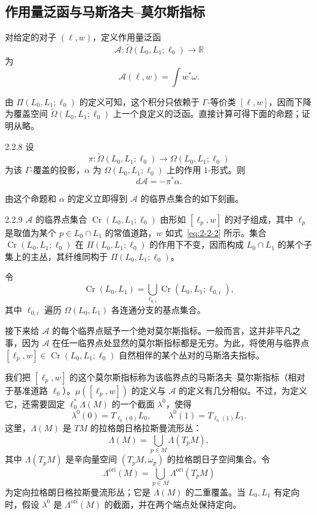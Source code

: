 \subsection{作用量泛函与马斯洛夫--莫尔斯指标}
\label{sec:2-2-2}

\begin{samepage}
对给定的对子 $(\ell,w)$，定义作用量泛函
\[
  \mathcal A:\widetilde\Omega(L_0,L_1;\ell_0)
  \longrightarrow\mathbb R
\]
为
\[
  \mathcal A(\ell,w)=\int w^*\omega.
\]
\end{samepage}
由 $\Pi(L_0,L_1;\ell_0)$ 的定义可知，这个积分只依赖于 $\Gamma$-等价类 $[\ell,w]$，因而下降为覆盖空间 $\widetilde\Omega(L_0,L_1;\ell_0)$ 上一个良定义的泛函。直接计算可得下面的命题；证明从略。

\begin{proposition}{2.2.8}\label{prop:2-2-8}
设
\[
  \pi:\widetilde\Omega(L_0,L_1;\ell_0)
  \longrightarrow\Omega(L_0,L_1;\ell_0)
\]
为该 $\Gamma$-覆盖的投影，$\alpha$ 为 $\Omega(L_0,L_1;\ell_0)$ 上的作用 $1$-形式。则
\[
  d\mathcal A=-\pi^*\alpha.
\]
\end{proposition}

由这个命题和 $\alpha$ 的定义立即得到 $\mathcal A$ 的临界点集合的如下刻画。

\begin{corollary}{2.2.9}\label{cor:2-2-9}
$\mathcal A$ 的临界点集合 $\operatorname{Cr}(L_0,L_1;\ell_0)$ 由形如 $[\ell_p,w]$ 的对子组成，其中 $\ell_p$ 是取值为某个 $p\in L_0\cap L_1$ 的常值道路，$w$ 如式~\eqref{eq:2-2-2} 所示。集合 $\operatorname{Cr}(L_0,L_1;\ell_0)$ 在 $\Pi(L_0,L_1;\ell_0)$ 的作用下不变，因而构成 $L_0\cap L_1$ 的某个子集上的主丛，其纤维同构于 $\Pi(L_0,L_1;\ell_0)$。
\end{corollary}

令
\[
  \operatorname{Cr}(L_0,L_1)
  =\bigcup_{\ell_{0,i}}
    \operatorname{Cr}(L_0,L_1;\ell_{0,i}),
\]
其中 $\ell_{0,i}$ 遍历 $\Omega(L_0,L_1)$ 各连通分支的基点集合。

接下来给 $\mathcal A$ 的每个临界点赋予一个绝对莫尔斯指标。一般而言，这并非平凡之事，因为 $\mathcal A$ 在任一临界点处显然的莫尔斯指标都是无穷。为此，将使用与临界点
$[\ell_p,w]\in\operatorname{Cr}(L_0,L_1;\ell_0)$ 自然相伴的某个丛对的马斯洛夫指标。

我们把 $[\ell_p,w]$ 的这个莫尔斯指标称为该临界点的马斯洛夫--莫尔斯指标（相对于基准道路 $\ell_0$）。$\mu([\ell_p,w])$ 的定义与 $\mathcal A$ 的定义有几分相似。不过，为定义它，还需要固定 $\ell_0^*\Lambda(M)$ 的一个截面 $\lambda^0$，使得
\[
  \lambda^0(0)=T_{\ell_0(0)}L_0,
  \qquad
  \lambda^0(1)=T_{\ell_0(1)}L_1.
\]
这里，$\Lambda(M)$ 是 $TM$ 的拉格朗日格拉斯曼流形丛：
\[
  \Lambda(M)=\bigcup_{p\in M}\Lambda(T_pM),
\]
其中 $\Lambda(T_pM)$ 是辛向量空间 $(T_pM,\omega_p)$ 的拉格朗日子空间集合。令
\[
  \Lambda^{\mathrm{ori}}(M)
  =\bigcup_{p\in M}\Lambda^{\mathrm{ori}}(T_pM)
\]
为定向拉格朗日格拉斯曼流形丛；它是 $\Lambda(M)$ 的二重覆盖。当 $L_0,L_1$ 有定向时，假设 $\lambda^0$ 是 $\Lambda^{\mathrm{ori}}(M)$ 的截面，并在两个端点处保持定向。

